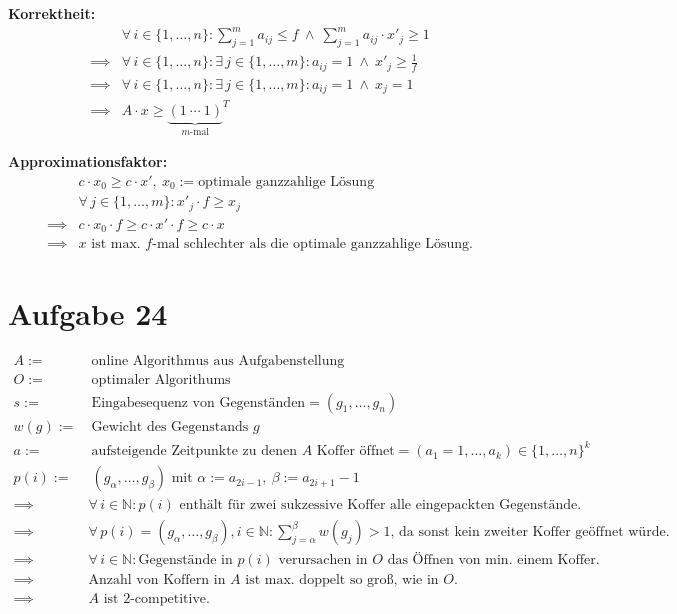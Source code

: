 \textbf{Korrektheit:}
\begin{align*}
	& \forall\, i \in \{ 1, \dots, n \}: \sum_{j = 1}^{m} a_{i j} \le f\ \land\ \sum_{j = 1}^{m} a_{i j} \cdot x'_{j} \ge 1 \\
	\implies & \forall\, i \in \{ 1, \dots, n \}: \exists\, j \in \{ 1, \dots, m \}: a_{i j} = 1\ \land\ x'_j \ge \frac{1}{f} \\
	\implies & \forall\, i \in \{ 1, \dots, n \}: \exists\, j \in \{ 1, \dots, m \}: a_{i j} = 1\ \land\ x_j = 1 \\
	\implies & A \cdot x \ge {\underbrace{(1\ \cdots\ 1)}_{m \text{-mal}}}^T
\end{align*}

\textbf{Approximationsfaktor:}
\begin{align*}
	& c \cdot x_0 \ge c \cdot x',\ x_0 := \text{optimale ganzzahlige Lösung} \\
	& \forall\, j \in \{ 1, \dots, m \}: x'_j \cdot f \ge x_j \\
	\implies & c \cdot x_0 \cdot f \ge c \cdot x' \cdot f \ge c \cdot x \\
	\implies & \text{$x$ ist max. $f$-mal schlechter als die optimale ganzzahlige Lösung.}
\end{align*}

\section*{Aufgabe 24}
\label{sec:Aufgabe 24}

\begin{align*}
	A := &\ \text{online Algorithmus aus Aufgabenstellung} \\
	O := &\ \text{optimaler Algorithums} \\
	s := &\ \text{Eingabesequenz von Gegenständen} = (g_1, \dots, g_n) \\
	w(g) := &\ \text{Gewicht des Gegenstands $g$} \\
	a := &\ \text{aufsteigende Zeitpunkte zu denen $A$ Koffer öffnet} = (a_1 = 1, \dots, a_k) \in \{ 1, \dots, n \}^k \\
	p(i) := &\ (g_\alpha, \dots, g_\beta) \text{ mit } \alpha := a_{2i - 1},\ \beta := a_{2i + 1} - 1 \\
	\implies & \forall\, i \in \mathbb{N}: p(i) \text{ enthält für zwei sukzessive Koffer alle eingepackten Gegenstände.} \\
	\implies & \forall\, p(i) = (g_\alpha, \dots, g_\beta), i \in \mathbb{N}: \sum_{j = \alpha}^{\beta} w(g_j) > 1 \text{, da sonst kein zweiter Koffer geöffnet würde.} \\
	\implies & \forall\, i \in \mathbb{N}: \text{Gegenstände in $p(i)$ verursachen in $O$ das Öffnen von min. einem Koffer.} \\
	\implies & \text{Anzahl von Koffern in $A$ ist max. doppelt so groß, wie in $O$.} \\
	\implies & \text{$A$ ist 2-competitive.}
\end{align*}


